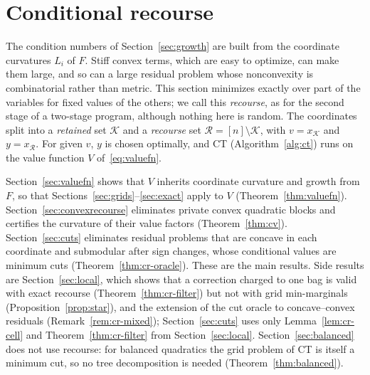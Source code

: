 \section{Conditional recourse}\label{sec:recourse}
The condition numbers of Section~\ref{sec:growth} are built from the
coordinate curvatures $L_i$ of $F$. Stiff convex terms, which are easy to
optimize, can make them large, and so can a large residual problem whose
nonconvexity is combinatorial rather than metric. This section minimizes
exactly over part of the variables for fixed values of the others; we call
this \emph{recourse}, as for the second stage of a two-stage program,
although nothing here is random. The coordinates split into a
\emph{retained} set $\mathcal K$ and a \emph{recourse} set
$\mathcal R=[n]\setminus\mathcal K$, with $v=x_{\mathcal K}$ and
$y=x_{\mathcal R}$. For given $v$, $y$ is chosen optimally, and CT
(Algorithm~\ref{alg:ct}) runs on the value function $V$
of~\eqref{eq:valuefn}.

Section~\ref{sec:valuefn} shows that $V$ inherits coordinate curvature and
growth from $F$, so that Sections~\ref{sec:grids}--\ref{sec:exact} apply to
$V$ (Theorem~\ref{thm:valuefn}). Section~\ref{sec:convexrecourse} eliminates
private convex quadratic blocks and certifies the curvature of their value
factors (Theorem~\ref{thm:cv}). Section~\ref{sec:cuts} eliminates residual
problems that are concave in each coordinate and submodular after sign
changes, whose conditional values are minimum cuts
(Theorem~\ref{thm:cr-oracle}). These are the main results. Side results are
Section~\ref{sec:local}, which shows that a correction charged to one bag is
valid with exact recourse (Theorem~\ref{thm:cr-filter}) but not with grid
min-marginals (Proposition~\ref{prop:star}), and the extension of the cut
oracle to concave--convex residuals (Remark~\ref{rem:cr-mixed});
Section~\ref{sec:cuts} uses only
Lemma~\ref{lem:cr-cell} and Theorem~\ref{thm:cr-filter} from
Section~\ref{sec:local}. Section~\ref{sec:balanced} does not use recourse:
for balanced quadratics the grid problem of CT is itself a minimum cut, so
no tree decomposition is needed (Theorem~\ref{thm:balanced}).







